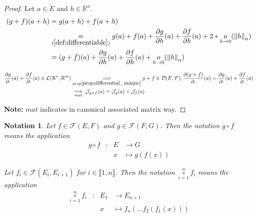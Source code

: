 \documentclass[11pt,en]{elegantpaper}
\newtheorem{notation}{Notation}
\newcommand{\norm}[1]{\left\lVert#1\right\rVert}
\newcommand{\Real}{\mathbb{R}}
\begin{document}
\begin{proof}
  Let $a \in \mathring{E}$ and $h \in \Real^n$.
  \begin{equation*}
    \begin{split}
      (g + f)(a+h) & = g(a+h) + f(a+h) \\
      & \underset{(\ref{def:differentiable})}{=} g(a) + f(a) + \frac{\partial g}{\partial h}(a) + \frac{\partial f}{\partial h}(a) + 2 * \underset{h \to 0}o(\norm h _n) \\
      & = (g + f)(a) + \frac{\partial g}{\partial h}(a) + \frac{\partial f}{\partial h}(a) + \underset{h \to 0}o(\norm h _n)
    \end{split}
  \end{equation*}

  \begin{equation*}
    \begin{split}
      \frac{\partial g}{\partial \cdot}(a) + \frac{\partial f}{\partial \cdot}(a) \in \mathcal{L}(\Real^n, \Real^m)
      & \underset{prop\ref{prop:differential_unique}}\implies g + f \in \mathcal{D}(E,F), \frac{\partial (g + f)}{\partial \cdot}(a) = \frac{\partial g}{\partial \cdot}(a) + \frac{\partial f}{\partial \cdot}(a) \\
      & \underset{mat}\implies \mathcal{J}_{g + f}(a) = \mathcal{J}_{g}(a) + \mathcal{J}_{f}(a)
    \end{split}
  \end{equation*} \par

  \textbf{Note:} $mat$ indicates in canonical associated matrix way. \par
\end{proof}

\begin{notation}
  Let $f \in \mathcal{F}(E,F)$ and $g \in \mathcal{F}(F,G)$.
  Then the notation $g \circ f$ means the application \begin{equation*}
    \begin{array}{llll}
      g \circ f & : & E & \longrightarrow G \\
        &   & x & \longmapsto g(f(x))
    \end{array}
  \end{equation*} \par

  Let $f_i \in \mathcal{F}(E_i,E_{i+1})$ for $i \in \llbracket 1,n \rrbracket$.
  Then the notation $\underset{i=1}{\overset{n}\circ} f_i$ means the application \begin{equation*}
    \begin{array}{llll}
      \underset{i=1}{\overset{n}\circ} f_i & : & E_1 & \longrightarrow E_{n+1} \\
        &   & x & \longmapsto f_n( \ldots f_2(f_1(x)))
    \end{array}
  \end{equation*}
\end{notation}
\end{document}
